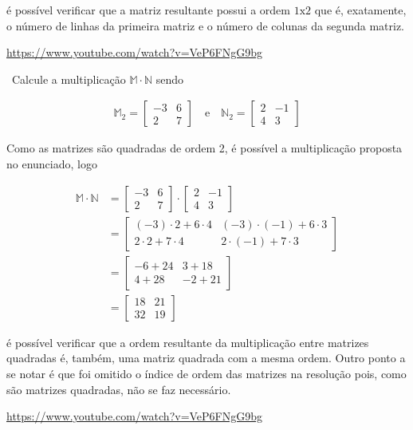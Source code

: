 \begin{example}
	é possível verificar que a matriz resultante possui a ordem $1\mathrm{x}2$ que é, exatamente, o número de linhas da primeira matriz e o número de colunas da segunda matriz.
	
\doutor \url{https://www.youtube.com/watch?v=VeP6FNgG9bg}
\end{example}


\begin{example}
	\video \, Calcule a multiplicação $\mathbb{M} \cdot \mathbb{N}$ sendo
	
	\begin{ceqn}
		\begin{align*}
			\mathbb{M}_{2}=\begin{bmatrix}-3 & 6\\
		2 & 7
		\end{bmatrix}\quad\mathrm{e}\quad\mathbb{N}_{2}=\begin{bmatrix}2 & -1\\
		4 & 3
		\end{bmatrix}
		\end{align*}
	\end{ceqn}
	
	Como as matrizes são quadradas de ordem 2, é possível a multiplicação proposta no enunciado, logo
	
	\begin{ceqn}
		\begin{align*}
		\mathbb{M}\cdot\mathbb{N} & =  \begin{bmatrix}-3 & 6\\
		2 & 7
		\end{bmatrix}\cdot\begin{bmatrix}2 & -1\\
		4 & 3
		\end{bmatrix}\\
		& = \begin{bmatrix}(-3)\cdot2+6\cdot4 & (-3)\cdot(-1)+6\cdot3\\
		2\cdot2+7\cdot4 & 2\cdot(-1)+7\cdot3
		\end{bmatrix}\\
		& =  \begin{bmatrix}-6+24 & 3+18\\
		4+28 & -2+21
		\end{bmatrix}\\
		& =  \begin{bmatrix}18 & 21\\
		32 & 19
		\end{bmatrix}
		\end{align*}
	\end{ceqn}
	
	é possível verificar que a ordem resultante da multiplicação entre matrizes quadradas é, também, uma matriz quadrada com a mesma ordem.
	Outro ponto a se notar é que foi omitido o índice de ordem das matrizes na resolução pois, como são matrizes quadradas, não se faz necessário.
	
\doutor \url{https://www.youtube.com/watch?v=VeP6FNgG9bg}
\end{example}


